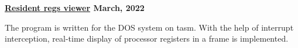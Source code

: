 \textbf{\href{https://github.com/jirol9xa/Resident-regs-viewer} {Resident regs viewer} \hfill March, 2022}\par

\begin{itemize}
    The program is written for the DOS system on tasm. With the help of interrupt interception, real-time display of processor registers in a frame is implemented.
\end{itemize}\par